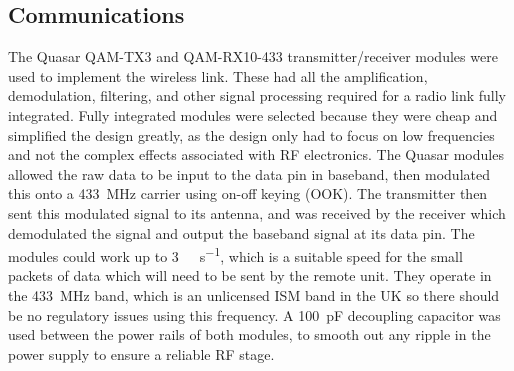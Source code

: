 \subsection{Communications}
The Quasar QAM-TX3 \cite{qam-tx} and QAM-RX10-433 \cite{qam-rx} transmitter/receiver modules were used to implement the wireless link. These had all the amplification, demodulation, filtering, and other signal processing required for a radio link fully integrated. Fully integrated modules were selected because they were cheap and simplified the design greatly, as the design only had to focus on low frequencies and not the complex effects associated with RF electronics. The Quasar modules allowed the raw data to be input to the data pin in baseband, then modulated this onto a \SI{433}{\mega\hertz} carrier using on-off keying (OOK). The transmitter then sent this modulated signal to its antenna, and was received by the receiver which demodulated the signal and output the baseband signal at its data pin. The modules could work up to \SI{3}{\kilo\bit\per\second}, which is a suitable speed for the small packets of data which will need to be sent by the remote unit. They operate in the \SI{433}{\mega\hertz} band, which is an unlicensed ISM band in the UK \cite{ism_band} so there should be no regulatory issues using this frequency. A \SI{100}{\pico\farad} decoupling capacitor was used between the power rails of both modules, to smooth out any ripple in the power supply to ensure a reliable RF stage.\\

